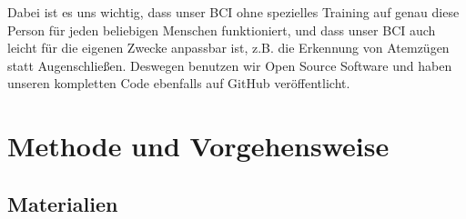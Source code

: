 \documentclass[11pt]{scrartcl}
\begin{document}
	Dabei ist es uns wichtig, dass unser BCI ohne spezielles Training auf genau diese Person für jeden beliebigen Menschen funktioniert, und dass unser BCI auch leicht für die eigenen Zwecke anpassbar ist, z.B. die Erkennung von Atemzügen statt Augenschließen. Deswegen benutzen wir Open Source Software und haben unseren kompletten Code ebenfalls auf GitHub veröffentlicht.

	\section{Methode und Vorgehensweise}

	\subsection{Materialien} \label{Materialien}
\end{document}
